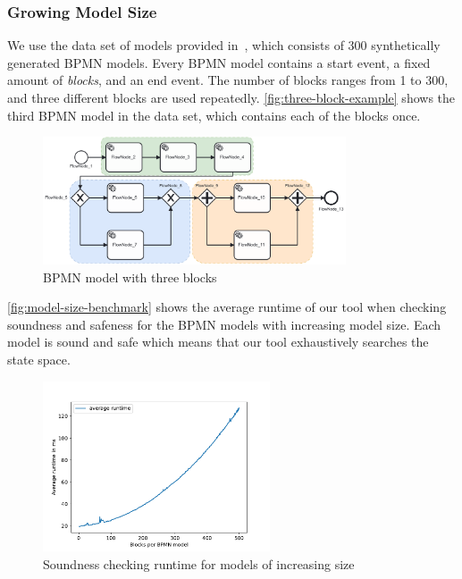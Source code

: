 \documentclass[runningheads]{llncs}
\begin{document}
\subsubsection{Growing Model Size} \label{subsec:model-size}
We use the data set of models provided in~\cite{krauterHigherorderTransformationApproach2023}, which consists of 300 synthetically generated BPMN models.
Every BPMN model contains a start event, a fixed amount of \textit{blocks}, and an end event.
The number of blocks ranges from 1 to 300, and three different blocks are used repeatedly.
\autoref{fig:three-block-example} shows the third BPMN model in the data set, which contains each of the blocks once.

\begin{figure}[ht]
	\centering
	\includegraphics[width=0.8\textwidth]{images/three-blocks}
	\caption{BPMN model with three blocks~\cite{krauterHigherorderTransformationApproach2023}}
	\label{fig:three-block-example}
\end{figure}

\autoref{fig:model-size-benchmark} shows the average runtime of our tool when checking soundness and safeness for the BPMN models with increasing model size.
Each model is sound and safe which means that our tool exhaustively searches the state space.

\begin{figure}[ht]
	\centering
	\includegraphics[width=0.6\textwidth]{images/model-size-benchmark}
	\caption{Soundness checking runtime for models of increasing size}
	\label{fig:model-size-benchmark}
\end{figure}
\end{document}
